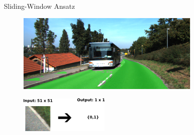\begin{frame}[squeeze]{Sliding-Window Ansatz}
\vspace{-1em}
\begin{figure}[H]
	\centering
	\includegraphics[width=0.8\textwidth]{../images/street.png}
\end{figure}
\vspace{-.2em}
\begin{minipage}{0.6\textwidth}
\centering
{}
\end{minipage}
\begin{minipage}{0.39\textwidth}
\begin{figure}[H]
	\centering
	\includegraphics[width=\textwidth]{../images/sliding_window.png}
\end{figure}
\end{minipage}


\end{frame}

